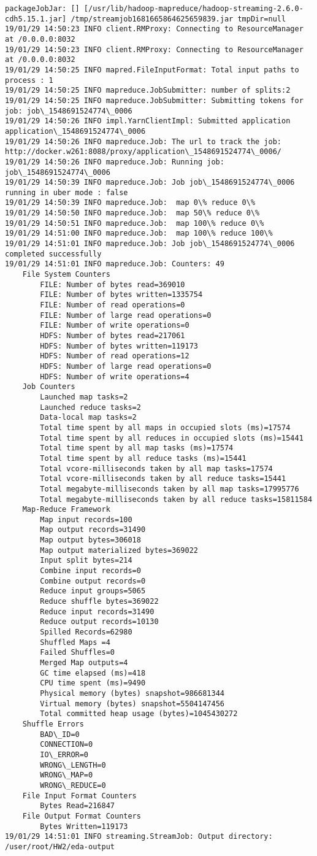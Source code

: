 \documentclass[11pt]{article}
\begin{document}
    \begin{Verbatim}[commandchars=\\\{\}]
packageJobJar: [] [/usr/lib/hadoop-mapreduce/hadoop-streaming-2.6.0-cdh5.15.1.jar] /tmp/streamjob1681665864625659839.jar tmpDir=null
19/01/29 14:50:23 INFO client.RMProxy: Connecting to ResourceManager at /0.0.0.0:8032
19/01/29 14:50:23 INFO client.RMProxy: Connecting to ResourceManager at /0.0.0.0:8032
19/01/29 14:50:25 INFO mapred.FileInputFormat: Total input paths to process : 1
19/01/29 14:50:25 INFO mapreduce.JobSubmitter: number of splits:2
19/01/29 14:50:25 INFO mapreduce.JobSubmitter: Submitting tokens for job: job\_1548691524774\_0006
19/01/29 14:50:26 INFO impl.YarnClientImpl: Submitted application application\_1548691524774\_0006
19/01/29 14:50:26 INFO mapreduce.Job: The url to track the job: http://docker.w261:8088/proxy/application\_1548691524774\_0006/
19/01/29 14:50:26 INFO mapreduce.Job: Running job: job\_1548691524774\_0006
19/01/29 14:50:39 INFO mapreduce.Job: Job job\_1548691524774\_0006 running in uber mode : false
19/01/29 14:50:39 INFO mapreduce.Job:  map 0\% reduce 0\%
19/01/29 14:50:50 INFO mapreduce.Job:  map 50\% reduce 0\%
19/01/29 14:50:51 INFO mapreduce.Job:  map 100\% reduce 0\%
19/01/29 14:51:00 INFO mapreduce.Job:  map 100\% reduce 100\%
19/01/29 14:51:01 INFO mapreduce.Job: Job job\_1548691524774\_0006 completed successfully
19/01/29 14:51:01 INFO mapreduce.Job: Counters: 49
	File System Counters
		FILE: Number of bytes read=369010
		FILE: Number of bytes written=1335754
		FILE: Number of read operations=0
		FILE: Number of large read operations=0
		FILE: Number of write operations=0
		HDFS: Number of bytes read=217061
		HDFS: Number of bytes written=119173
		HDFS: Number of read operations=12
		HDFS: Number of large read operations=0
		HDFS: Number of write operations=4
	Job Counters 
		Launched map tasks=2
		Launched reduce tasks=2
		Data-local map tasks=2
		Total time spent by all maps in occupied slots (ms)=17574
		Total time spent by all reduces in occupied slots (ms)=15441
		Total time spent by all map tasks (ms)=17574
		Total time spent by all reduce tasks (ms)=15441
		Total vcore-milliseconds taken by all map tasks=17574
		Total vcore-milliseconds taken by all reduce tasks=15441
		Total megabyte-milliseconds taken by all map tasks=17995776
		Total megabyte-milliseconds taken by all reduce tasks=15811584
	Map-Reduce Framework
		Map input records=100
		Map output records=31490
		Map output bytes=306018
		Map output materialized bytes=369022
		Input split bytes=214
		Combine input records=0
		Combine output records=0
		Reduce input groups=5065
		Reduce shuffle bytes=369022
		Reduce input records=31490
		Reduce output records=10130
		Spilled Records=62980
		Shuffled Maps =4
		Failed Shuffles=0
		Merged Map outputs=4
		GC time elapsed (ms)=418
		CPU time spent (ms)=9490
		Physical memory (bytes) snapshot=986681344
		Virtual memory (bytes) snapshot=5504147456
		Total committed heap usage (bytes)=1045430272
	Shuffle Errors
		BAD\_ID=0
		CONNECTION=0
		IO\_ERROR=0
		WRONG\_LENGTH=0
		WRONG\_MAP=0
		WRONG\_REDUCE=0
	File Input Format Counters 
		Bytes Read=216847
	File Output Format Counters 
		Bytes Written=119173
19/01/29 14:51:01 INFO streaming.StreamJob: Output directory: /user/root/HW2/eda-output


\end{Verbatim}
\end{document}
